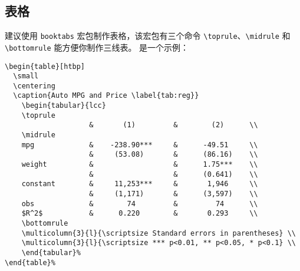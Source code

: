 \documentclass[lang=cn,11pt,numbers, a4paper]{elegantpaper}
\begin{document}
\subsection{表格}
建议使用 \lstinline{booktabs} 宏包制作表格，该宏包有三个命令 \lstinline{\toprule}、\lstinline{\midrule} 和 \lstinline[breaklines]{\bottomrule} 能方便你制作三线表。 是一个示例：
\begin{lstlisting}
\begin{table}[htbp]
  \small
  \centering
  \caption{Auto MPG and Price \label{tab:reg}}
    \begin{tabular}{lcc}
    \toprule
                    &       (1)         &        (2)      \\
    \midrule
    mpg             &    -238.90***     &      -49.51     \\
                    &     (53.08)       &      (86.16)    \\
    weight          &                   &      1.75***    \\
                    &                   &      (0.641)    \\
    constant        &     11,253***     &       1,946     \\
                    &     (1,171)       &      (3,597)    \\
    obs             &        74         &         74      \\
    $R^2$           &      0.220        &       0.293     \\
    \bottomrule
    \multicolumn{3}{l}{\scriptsize Standard errors in parentheses} \\
    \multicolumn{3}{l}{\scriptsize *** p<0.01, ** p<0.05, * p<0.1} \\
    \end{tabular}%
\end{table}%
\end{lstlisting}
\end{document}
